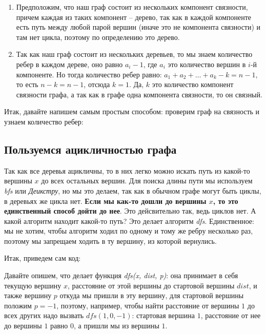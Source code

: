 \documentclass[../../main.tex]{subfiles}
\begin{document}
\begin{enumerate}
    \item Предположим, что наш граф состоит из нескольких компонент связности, причем каждая из таких компонент -- дерево, так как 
    в каждой компоненте есть путь между любой парой вершин (иначе это не компонента связности) и там нет цикла, поэтому по определению это дерево. 
    \item Так как наш граф состоит из нескольких деревьев, то мы знаем количество ребер в каждом дереве, оно равно $a_i - 1$, 
    где $a_i$ это количество вершин в $i$-й компоненте. Но тогда количество ребер равно: $a_1 + a_2 + \ldots + a_k - k = n - 1$, то есть 
    $n - k = n - 1$, отсюда $k=1$. Да, $k$ это количество компонент связности графа, а так как в графе одна компонента связности, то он связный. 
\end{enumerate}

Итак, давайте напишем самым простым способом: проверим граф на связность и узнаем количество ребер: 




\subsection{Пользуемся ацикличностью графа}

Так как все деревья ацикличны, то в них легко можно искать путь из какой-то вершины $x$ до всех остальных вершин. Для поиска 
длины пути мы используем \textit{bfs} или \textit{Деикстру}, но мы это делаем, так как в обычном графе могут быть циклы, в деревьях же цикла нет. 
\textbf{Если мы как-то дошли до вершины $x$, то это единственный способ дойти до нее}. Это дейсвительно так, ведь циклов нет. А какой алгоритм 
находит какой-то путь? Это делает алгоритм \textit{dfs}. Единственное: мы не хотим, чтобы алгоритм ходил по одному и тому же ребру несколько раз, поэтому 
мы запрещаем ходить в ту вершину, из которой вернулись.  

Итак, приведем сам код:




Давайте опишем, что делает функция \textit{dfs(x, dist, p)}: она принимает в себя текущую вершину $x$, расстояние от этой вершины до стартовой вершины $dist$, 
и также вершину $p$ откуда мы пришли в эту вершину, для стартовой вершины положим $p=-1$, поэтому, например, чтобы найти расстояние от вершины $1$ до всех других 
надо вызвать $dfs(1, 0, -1)$: стартовая вершина $1$, расстояние от нее до вершины $1$ равно $0$, а пришли мы из вершины $1$. 
\end{document}
